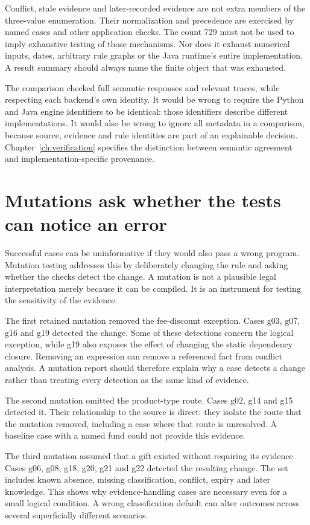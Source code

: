 Conflict, stale evidence and later-recorded evidence are not extra members of
the three-value enumeration. Their normalization and precedence are exercised
by named cases and other application checks. The count 729 must not be used to
imply exhaustive testing of those mechanisms. Nor does it exhaust numerical
inputs, dates, arbitrary rule graphs or the Java runtime's entire implementation.
A result summary should always name the finite object that was exhausted.

The comparison checked full semantic responses and relevant traces, while
respecting each backend's own identity. It would be wrong to require the Python
and Java engine identifiers to be identical: those identifiers describe
different implementations. It would also be wrong to ignore all metadata in a
comparison, because source, evidence and rule identities are part of an
explainable decision. Chapter~\ref{ch:verification} specifies the distinction
between semantic agreement and implementation-specific provenance.

\section{Mutations ask whether the tests can notice an error}
\label{sec:circular-mutations}
Successful cases can be uninformative if they would also pass a wrong program.
Mutation testing addresses this by deliberately changing the rule and asking
whether the checks detect the change. A mutation is not a plausible legal
interpretation merely because it can be compiled. It is an instrument for
testing the sensitivity of the evidence.

The first retained mutation removed the fee-discount exception. Cases g03, g07,
g16 and g19 detected the change. Some of these detections concern the logical
exception, while g19 also exposes the effect of changing the static dependency
closure. Removing an expression can remove a referenced fact from conflict
analysis. A mutation report should therefore explain why a case detects a
change rather than treating every detection as the same kind of evidence.

The second mutation omitted the product-type route. Cases g02, g14 and g15
detected it. Their relationship to the source is direct: they isolate the
route that the mutation removed, including a case where that route is
unresolved. A baseline case with a named fund could not provide this evidence.

The third mutation assumed that a gift existed without requiring its evidence.
Cases g06, g08, g18, g20, g21 and g22 detected the resulting change. The set
includes known absence, missing classification, conflict, expiry and later
knowledge. This shows why evidence-handling cases are necessary even for a
small logical condition. A wrong classification default can alter outcomes
across several superficially different scenarios.

